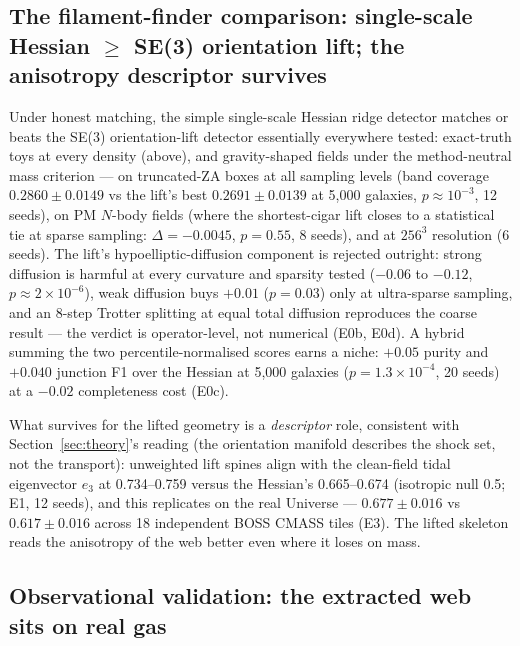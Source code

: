 \documentclass[11pt]{article}
\begin{document}
\subsection{The filament-finder comparison: single-scale Hessian \texorpdfstring{$\geq$}{>=} SE(3) orientation lift; the anisotropy descriptor survives}
\label{sec:finders}

Under honest matching, the simple single-scale Hessian ridge detector matches or beats the SE(3) orientation-lift detector essentially everywhere tested: exact-truth toys at every density (above), and gravity-shaped fields under the method-neutral mass criterion --- on truncated-ZA boxes at all sampling levels (band coverage $0.2860 \pm 0.0149$ vs the lift's best $0.2691 \pm 0.0139$ at 5,000 galaxies, $p \approx 10^{-3}$, 12 seeds), on PM $N$-body fields (where the shortest-cigar lift closes to a statistical tie at sparse sampling: $\Delta = -0.0045$, $p = 0.55$, 8 seeds), and at $256^3$ resolution (6 seeds). The lift's hypoelliptic-diffusion component is rejected outright: strong diffusion is harmful at every curvature and sparsity tested ($-0.06$ to $-0.12$, $p \approx 2\times10^{-6}$), weak diffusion buys $+0.01$ ($p = 0.03$) only at ultra-sparse sampling, and an 8-step Trotter splitting at equal total diffusion reproduces the coarse result --- the verdict is operator-level, not numerical (E0b, E0d). A hybrid summing the two percentile-normalised scores earns a niche: $+0.05$ purity and $+0.040$ junction F1 over the Hessian at 5,000 galaxies ($p = 1.3\times10^{-4}$, 20 seeds) at a $-0.02$ completeness cost (E0c).

What survives for the lifted geometry is a \emph{descriptor} role, consistent with Section~\ref{sec:theory}'s reading (the orientation manifold describes the shock set, not the transport): unweighted lift spines align with the clean-field tidal eigenvector $e_3$ at 0.734--0.759 versus the Hessian's 0.665--0.674 (isotropic null 0.5; E1, 12 seeds), and this replicates on the real Universe --- $0.677 \pm 0.016$ vs $0.617 \pm 0.016$ across 18 independent BOSS CMASS tiles (E3). The lifted skeleton reads the anisotropy of the web better even where it loses on mass.

\subsection{Observational validation: the extracted web sits on real gas}
\label{sec:observational}
\end{document}
